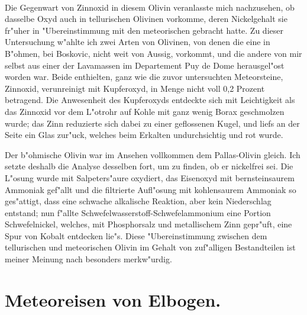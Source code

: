 \documentclass[a4paper, 11pt, oneside]{article}
\begin{document}
\paragraph{}
Die Gegenwart von Zinnoxid in diesem Olivin veranlasste mich nachzusehen, ob dasselbe Oxyd auch in tellurischen Olivinen vorkomme, deren Nickelgehalt sie fr"uher in "Ubereinstimmung mit den meteorischen gebracht hatte. Zu dieser Untersuchung w"ahlte ich zwei Arten von Olivinen, von denen die eine in B"ohmen, bei Boskovic, nicht weit von Aussig, vorkommt, und die andere von mir selbst aus einer der Lavamassen im Departement Puy de Dome herausgel"ost worden war. Beide enthielten, ganz wie die zuvor untersuchten Meteorsteine, Zinnoxid, verunreinigt mit Kupferoxyd, in Menge nicht voll 0,2 Prozent betragend. Die Anwesenheit des Kupferoxyds entdeckte sich mit Leichtigkeit als das Zinnoxid vor dem L"otrohr auf Kohle mit ganz wenig Borax geschmolzen wurde; das Zinn reduzierte sich dabei zu einer geflossenen Kugel, und liefs an der Seite ein Glas zur"uck, welches beim Erkalten undurchsichtig und rot wurde.

Der b"ohmische Olivin war im Ansehen vollkommen dem Pallas-Olivin gleich. Ich setzte deshalb die Analyse desselben fort, um zu finden, ob er nickelfrei sei. Die L"osung wurde mit Salpeters"aure oxydiert, das Eisenoxyd mit bernsteinsaurem Ammoniak gef"allt und die filtrierte Aufl"osung mit kohlensaurem Ammoniak so ges"attigt, dass eine schwache alkalische Reaktion, aber kein Niederschlag entstand; nun f"allte Schwefelwasserstoff-Schwefelammonium eine Portion Schwefelnickel, welches, mit Phosphorsalz und metallischem Zinn gepr"uft, eine Spur von Kobalt entdecken lie"s. Diese "Ubereinstimmung zwischen dem tellurischen und meteorischen Olivin im Gehalt von zuf"alligen Bestandteilen ist meiner Meinung nach besonders merkw"urdig.

\section{Meteoreisen von Elbogen.}
\end{document}

